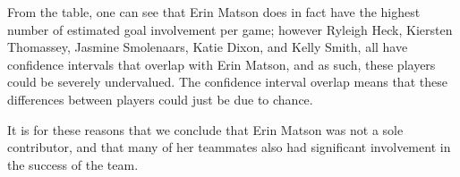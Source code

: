 \documentclass{article} %
\begin{document}
From the table, one can see that Erin Matson does in fact have the highest number of estimated goal involvement per game; however Ryleigh Heck, Kiersten Thomassey, Jasmine Smolenaars, Katie Dixon, and Kelly Smith, all have confidence intervals that overlap with Erin Matson, and as such, these players could be severely undervalued. The confidence interval overlap means that these differences between players could just be due to chance.

It is for these reasons that we conclude that Erin Matson was not a sole contributor, and that many of her teammates also had significant involvement in the success of the team. 
\end{document}
